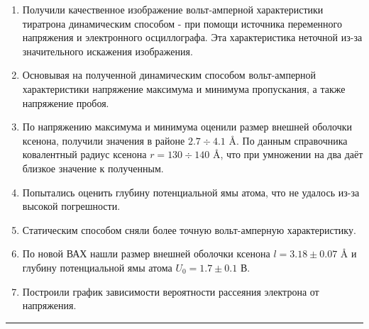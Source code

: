 \documentclass[a4paper,12pt]{article} %
\begin{document}
\begin{enumerate}
\item Получили качественное изображение вольт-амперной характеристики тиратрона динамическим способом - при помощи источника переменного напряжения и электронного осциллографа. Эта характеристика неточной из-за значительного искажения изображения.
\item Основывая на полученной динамическим способом вольт-амперной характеристики напряжение максимума и минимума пропускания, а также напряжение пробоя.
\item По напряжению максимума и минимума оценили размер внешней оболочки ксенона, получили значения в районе $2.7\div4.1$ Å. По данным справочника ковалентный радиус ксенона $r = 130\div140$ Å, что при умножении на два даёт близкое значение к полученным.
\item Попытались оценить глубину потенциальной ямы атома, что не удалось из-за высокой погрешности.
\item Статическим способом сняли более точную вольт-амперную характеристику.
\item По новой ВАХ нашли размер внешней оболочки ксенона $l = 3.18 \pm 0.07$ Å и глубину потенциальной ямы атома $U_0 = 1.7 \pm 0.1$ В.
\item Построили график зависимости вероятности рассеяния электрона от напряжения.
\end{enumerate}


\medskip\hrule\medskip
\end{document}
